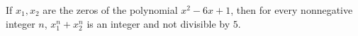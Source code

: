 If $x_1, x_2$ are the zeros of the polynomial $x^2 - 6x + 1$, then for every nonnegative integer $n$, $x_1^n + x_2^n$ is an integer and not divisible by $5$.

